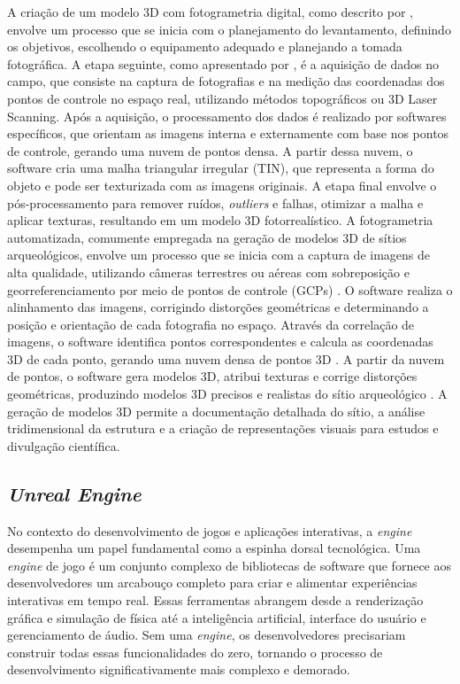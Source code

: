     A criação de um modelo 3D com fotogrametria digital, como descrito por \cite{silva2022realidade}, envolve um processo que se inicia com o planejamento do levantamento, definindo os objetivos, escolhendo o equipamento adequado e planejando a tomada fotográfica. A etapa seguinte, como apresentado por \cite{groetelaars2004estudo}, é a aquisição de dados no campo, que consiste na captura de fotografias e na medição das coordenadas dos pontos de controle no espaço real, utilizando métodos topográficos ou 3D Laser Scanning. Após a aquisição, o processamento dos dados é realizado por softwares específicos, que orientam as imagens interna e externamente com base nos pontos de controle, gerando uma nuvem de pontos densa. A partir dessa nuvem, o software cria uma malha triangular irregular (TIN), que representa a forma do objeto e pode ser texturizada com as imagens originais. A etapa final envolve o pós-processamento para remover ruídos, \textit{outliers} e falhas, otimizar a malha e aplicar texturas, resultando em um modelo 3D fotorrealístico.
    A fotogrametria automatizada, comumente empregada na geração de modelos 3D de sítios arqueológicos, envolve um processo que se inicia com a captura de imagens de alta qualidade, utilizando câmeras terrestres ou aéreas com sobreposição e georreferenciamento por meio de pontos de controle (GCPs) \citep{McGlone2004}. O software realiza o alinhamento das imagens, corrigindo distorções geométricas e determinando a posição e orientação de cada fotografia no espaço. Através da correlação de imagens, o software identifica pontos correspondentes e calcula as coordenadas 3D de cada ponto, gerando uma nuvem densa de pontos 3D \citep{Heipke2001}. A partir da nuvem de pontos, o software gera modelos 3D, atribui texturas e corrige distorções geométricas, produzindo modelos 3D precisos e realistas do sítio arqueológico \citep{Gruen2008}. A geração de modelos 3D permite a documentação detalhada do sítio, a análise tridimensional da estrutura e a criação de representações visuais para estudos e divulgação científica.
    
    
    \subsection{\textit{Unreal Engine}}No contexto do desenvolvimento de jogos e aplicações interativas, a \textit{engine} desempenha um papel fundamental como a espinha dorsal tecnológica. Uma \textit{engine} de jogo é um conjunto complexo de bibliotecas de software que fornece aos desenvolvedores um arcabouço completo para criar e alimentar experiências interativas em tempo real. Essas ferramentas abrangem desde a renderização gráfica e simulação de física até a inteligência artificial, interface do usuário e gerenciamento de áudio. Sem uma \textit{engine}, os desenvolvedores precisariam construir todas essas funcionalidades do zero, tornando o processo de desenvolvimento significativamente mais complexo e demorado. 
    
